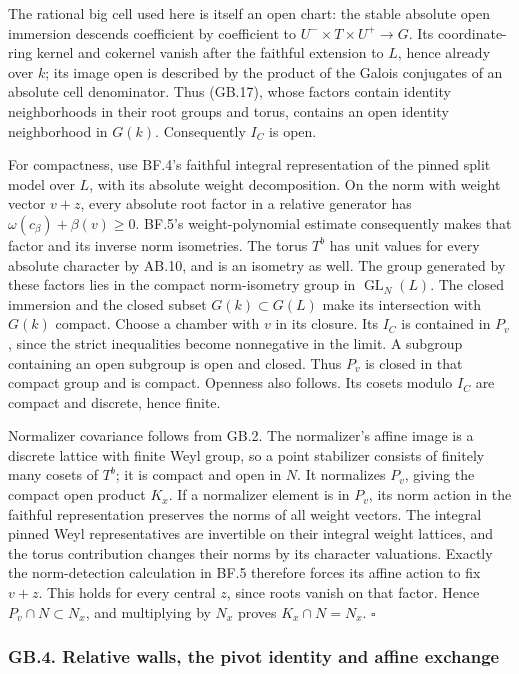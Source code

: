 \documentclass[
  11pt,
]{article}
\begin{document}
The rational big cell used here is itself an open chart: the stable
absolute open immersion descends coefficient by coefficient to
\(U^-\times T\times U^+\to G\). Its coordinate-ring kernel and cokernel
vanish after the faithful extension to \(L\), hence already over \(k\);
its image open is described by the product of the Galois conjugates of
an absolute cell denominator. Thus (GB.17), whose factors contain
identity neighborhoods in their root groups and torus, contains an open
identity neighborhood in \(G(k)\). Consequently \(I_C\) is open.

For compactness, use BF.4's faithful integral representation of the
pinned split model over \(L\), with its absolute weight decomposition.
On the norm with weight vector \(v+z\), every absolute root factor in a
relative generator has \(\omega(c_\beta)+\beta(v)\ge0\). BF.5's
weight-polynomial estimate consequently makes that factor and its
inverse norm isometries. The torus \(T^b\) has unit values for every
absolute character by AB.10, and is an isometry as well. The group
generated by these factors lies in the compact norm-isometry group in
\(\operatorname{GL}_N(L)\). The closed immersion and the closed subset
\(G(k)\subset G(L)\) make its intersection with \(G(k)\) compact. Choose
a chamber with \(v\) in its closure. Its \(I_C\) is contained in
\(P_v\), since the strict inequalities become nonnegative in the limit.
A subgroup containing an open subgroup is open and closed. Thus \(P_v\)
is closed in that compact group and is compact. Openness also follows.
Its cosets modulo \(I_C\) are compact and discrete, hence finite.

Normalizer covariance follows from GB.2. The normalizer's affine image
is a discrete lattice with finite Weyl group, so a point stabilizer
consists of finitely many cosets of \(T^b\); it is compact and open in
\(N\). It normalizes \(P_v\), giving the compact open product \(K_x\).
If a normalizer element is in \(P_v\), its norm action in the faithful
representation preserves the norms of all weight vectors. The integral
pinned Weyl representatives are invertible on their integral weight
lattices, and the torus contribution changes their norms by its
character valuations. Exactly the norm-detection calculation in BF.5
therefore forces its affine action to fix \(v+z\). This holds for every
central \(z\), since roots vanish on that factor. Hence
\(P_v\cap N\subset N_x\), and multiplying by \(N_x\) proves
\(K_x\cap N=N_x\). \(\square\)

\subsubsection{GB.4. Relative walls, the pivot identity and affine
exchange}\label{gb.4.-relative-walls-the-pivot-identity-and-affine-exchange}
\end{document}
